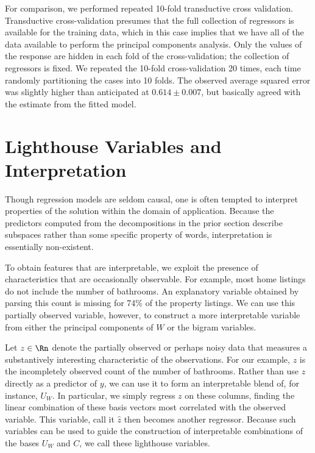 \documentclass[12pt]{article}
\begin{document}
For comparison, we performed repeated 10-fold transductive cross validation.  Transductive cross-validation presumes that the full collection of regressors is available for the training data, which in this case implies that we have all of the data available to perform the principal components analysis.  Only the values of the response are hidden in each fold of the cross-validation; the collection of regressors is fixed.  We repeated the 10-fold cross-validation 20 times, each time randomly partitioning the cases into 10 folds. The observed average squared error was slightly higher than anticipated at $0.614 \pm 0.007$, but basically agreed with the estimate from the fitted model. 


\section{Lighthouse Variables and Interpretation}
\label{sec:light}
 
 Though regression models are seldom causal, one is often tempted to interpret
 properties of the solution within the domain of application.  Because the
 predictors computed from the decompositions in the prior section describe
 subspaces rather than some specific property of words, interpretation is
 essentially non-existent.


 To obtain features that are interpretable, we exploit the presence of
 characteristics that are occasionally observable.  For example,
 most home listings do not include the number of bathrooms.  An
 explanatory variable obtained by parsing this count is missing for 74\% of the property listings.  We can use this partially observed variable, however, to construct a more interpretable variable from either the principal components of $W$ or the bigram variables.  


 Let $z \in \Rn$ denote the partially observed or perhaps noisy data
 that measures a substantively interesting characteristic of the
 observations.  For our example, $z$ is the incompletely observed count of the number of bathrooms.  Rather than use $z$ directly as a predictor of $y$, we
 can use it to form an interpretable blend of, for instance, $U_W$.   In
 particular, we simply regress $z$ on these columns, finding the
 linear combination of these basis vectors most correlated with the
 observed variable.  This variable, call it $\hat{z}$ then becomes
 another regressor.  Because such variables can be used to guide the
 construction of interpretable combinations of the bases $U_W$ and
 $C$, we call these lighthouse variables.  
 
\end{document}
